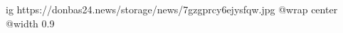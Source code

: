  
 
 
 
 

\ifcmt
  ig https://donbas24.news/storage/news/7gzgprcy6ejysfqw.jpg
  @wrap center
  @width 0.9
\fi
